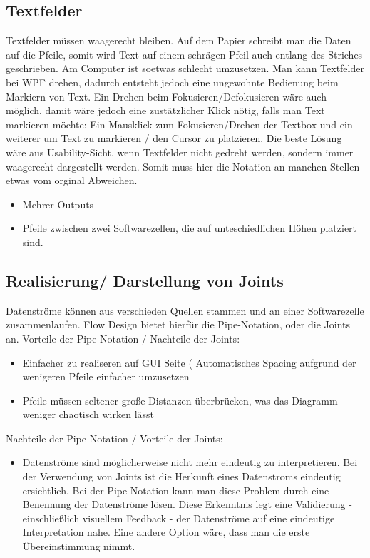 \documentclass[11pt]{article}
\begin{document}
\subsection{Textfelder}
\label{sec:orgheadline16}
Textfelder müssen waagerecht bleiben. Auf dem Papier schreibt man die Daten auf
die Pfeile, somit wird Text auf einem schrägen Pfeil auch entlang des Striches
geschrieben.
Am Computer ist soetwas schlecht umzusetzen. Man kann Textfelder bei WPF drehen, dadurch
entsteht jedoch eine ungewohnte Bedienung beim Markiern von Text. Ein Drehen
beim Fokusieren/Defokusieren wäre auch möglich, damit wäre jedoch eine zustätzlicher
Klick nötig, falls man Text markieren möchte: Ein Mausklick zum Fokusieren/Drehen
der Textbox und ein weiterer um Text zu markieren / den Cursor zu platzieren.
Die beste Lösung wäre aus Usability-Sicht, wenn Textfelder nicht gedreht werden,
sondern immer waagerecht dargestellt werden. Somit muss hier die Notation an
manchen Stellen etwas vom orginal Abweichen.
\begin{itemize}
\item Mehrer Outputs
\item Pfeile zwischen zwei Softwarezellen, die auf unteschiedlichen Höhen platziert sind.
\end{itemize}

\subsection{Realisierung/ Darstellung von Joints}
\label{sec:orgheadline17}
Datenströme können aus verschieden Quellen stammen und an einer Softwarezelle
zusammenlaufen. Flow Design bietet hierfür die Pipe-Notation, oder die Joints
an. 
Vorteile der Pipe-Notation / Nachteile der Joints:
\begin{itemize}
\item Einfacher zu realiseren auf GUI Seite ( Automatisches Spacing aufgrund der
wenigeren Pfeile einfacher umzusetzen
\item Pfeile müssen seltener große Distanzen überbrücken, was das Diagramm weniger
chaotisch wirken lässt
\end{itemize}
Nachteile der Pipe-Notation / Vorteile der Joints:
\begin{itemize}
\item Datenströme sind möglicherweise nicht mehr eindeutig zu interpretieren. Bei
der Verwendung von Joints ist die Herkunft eines Datenstroms eindeutig
ersichtlich. Bei der Pipe-Notation kann man diese Problem durch eine Benennung
der Datenströme lösen. Diese Erkenntnis legt eine Validierung - einschließlich
visuellem Feedback - der Datenströme auf eine eindeutige Interpretation nahe.
Eine andere Option wäre, dass man die erste Übereinstimmung nimmt.
\end{itemize}
\end{document}
